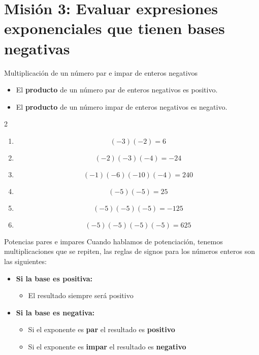 \documentclass[12pt, letterpaper]{article}
\begin{document}
	\section*{Misión 3: Evaluar expresiones exponenciales que tienen bases negativas}
	
	\begin{concepto}{Multiplicación de un número par e impar de enteros negativos}
		\begin{itemize}
			\item El \textbf{producto} de un número par de enteros negativos es positivo.
			\item El \textbf{producto} de un número impar de enteros negativos es negativo.
		\end{itemize}
	\end{concepto}
	\begin{ejemplo}
		\begin{multicols}{2}
			\begin{enumerate}[label=\textbf{\arabic*.}, itemsep=0.8cm]
				\item $$(-3)(-2)=6$$
				\item $$(-2)(-3)(-4)=-24$$
				\item $$(-1)(-6)(-10)(-4)=240$$
				\item $$(-5)(-5)=25$$
				\item $$(-5)(-5)(-5)=-125$$
				\item $$(-5)(-5)(-5)(-5)=625$$
			\end{enumerate}
		\end{multicols}
	\end{ejemplo}
	\begin{concepto}{Potencias pares e impares}
		Cuando hablamos de potenciación, tenemos multiplicaciones que se repiten, las reglas de signos para los números enteros son las siguientes:
		\begin{itemize}
			\item \textbf{Si la base es positiva:}
			\begin{itemize}
				\item El resultado siempre será positivo
			\end{itemize}
			\item \textbf{Si la base es negativa:}
			\begin{itemize}
				\item Si el exponente es \textbf{par} el resultado es \textbf{positivo}
				\item Si el exponente es \textbf{impar} el resultado es \textbf{negativo}
			\end{itemize} 
			
		\end{itemize}
	\end{concepto}
\end{document}
